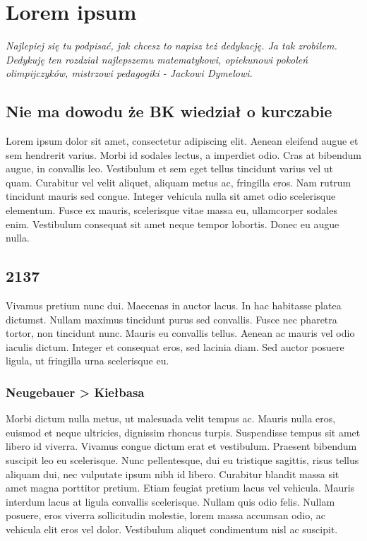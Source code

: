 \renewcommand{\autor}{Koguś Brasz}
\chapter{Lorem ipsum}
\textit{Najlepiej się tu podpisać, jak chcesz to napisz też dedykację. Ja tak zrobiłem. Dedykuję ten rozdział najlepszemu matematykowi, opiekunowi pokoleń olimpijczyków, mistrzowi pedagogiki - Jackowi Dymelowi.}
\section{Nie ma dowodu że BK wiedział o kurczabie}
Lorem ipsum dolor sit amet, consectetur adipiscing elit. Aenean eleifend augue et sem hendrerit varius. Morbi id sodales lectus, a imperdiet odio. Cras at bibendum augue, in convallis leo. Vestibulum et sem eget tellus tincidunt varius vel ut quam. Curabitur vel velit aliquet, aliquam metus ac, fringilla eros. Nam rutrum tincidunt mauris sed congue. Integer vehicula nulla sit amet odio scelerisque elementum. Fusce ex mauris, scelerisque vitae massa eu, ullamcorper sodales enim. Vestibulum consequat sit amet neque tempor lobortis. Donec eu augue nulla.
\section{2137}
Vivamus pretium nunc dui. Maecenas in auctor lacus. In hac habitasse platea dictumst. Nullam maximus tincidunt purus sed convallis. Fusce nec pharetra tortor, non tincidunt nunc. Mauris eu convallis tellus. Aenean ac mauris vel odio iaculis dictum. Integer et consequat eros, sed lacinia diam. Sed auctor posuere ligula, ut fringilla urna scelerisque eu.
\subsection{Neugebauer > Kiełbasa}
Morbi dictum nulla metus, ut malesuada velit tempus ac. Mauris nulla eros, euismod et neque ultricies, dignissim rhoncus turpis. Suspendisse tempus sit amet libero id viverra. Vivamus congue dictum erat et vestibulum. Praesent bibendum suscipit leo eu scelerisque. Nunc pellentesque, dui eu tristique sagittis, risus tellus aliquam dui, nec vulputate ipsum nibh id libero. Curabitur blandit massa sit amet magna porttitor pretium. Etiam feugiat pretium lacus vel vehicula. Mauris interdum lacus at ligula convallis scelerisque. Nullam quis odio felis. Nullam posuere, eros viverra sollicitudin molestie, lorem massa accumsan odio, ac vehicula elit eros vel dolor. Vestibulum aliquet condimentum nisl ac suscipit.
